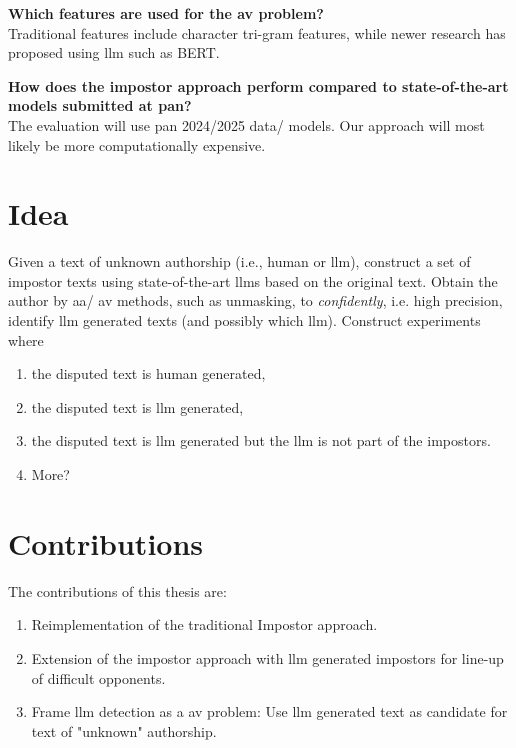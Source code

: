 \begin{questions}
    \item \textbf{Which features are used for the \ac{av} problem?} \label{enum:rq3} \hfill \\
    Traditional features include character tri-gram features, while newer research has proposed using \ac{llm} such as BERT.

    \item \textbf{How does the impostor approach perform compared to state-of-the-art models submitted at \ac{pan}?} \label{enum:rq4} \hfill \\
    The evaluation will use \ac{pan} 2024/2025 data/ models.
    Our approach will most likely be more computationally expensive.
\end{questions}

\section*{Idea}
\label{sec:idea}

Given a text of unknown authorship (i.e., human or \ac{llm}), 
construct a set of impostor texts using state-of-the-art \acp{llm} based on the original text.
Obtain the author by \ac{aa}/ \ac{av} methods, such as unmasking, to \textit{confidently}, i.e. high precision, identify \ac{llm} generated texts
(and possibly which \ac{llm}).
Construct experiments where
\begin{enumerate}
    \item the disputed text is human generated,
    \item the disputed text is \ac{llm} generated,
    \item the disputed text is \ac{llm} generated but the \ac{llm} is not part of the impostors.
    \item More?
\end{enumerate}


\section*{Contributions}
\label{sec:contributions}
The contributions of this thesis are:
\begin{enumerate}
    \item Reimplementation of the traditional Impostor approach.
    \item Extension of the impostor approach with \ac{llm} generated impostors for line-up of difficult opponents. 
    \item Frame \ac{llm} detection as a \ac{av} problem: Use \ac{llm} generated text as candidate for text of "unknown" authorship.
\end{enumerate}
